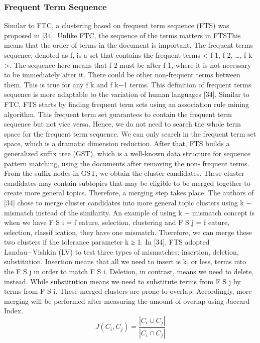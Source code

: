 \documentclass{VUMIFInfKursinis}
\begin{document}
		\subsubsection{Frequent Term Sequence}
			Similar to FTC, a clustering based on frequent term sequence (FTS) was proposed in [34]. Unlike FTC, the sequence of the terms matters in FTS\. This means that the order of terms in the document is important. The frequent terms sequence, denoted as f, is a set that contains the frequent terms < f 1, f 2, \ldots, f k >. The sequence here means that f 2 must be after f 1, where it is not necessary to be immediately after it. There could be other non-frequent terms between them. This is true for any f k and f k−1 terms. This definition of frequent terms sequence is more adaptable to the variation of human languages [34].
			Similar to FTC, FTS starts by finding frequent term sets using an association rule mining algorithm. This frequent term set guarantees to contain the frequent term sequence but not vice versa. Hence, we do not need to search the whole term space for the frequent term sequence. We can only search in the frequent term set space, which is a dramatic dimension reduction. After that, FTS builds a generalized suffix tree (GST), which is a well-known data structure for sequence pattern matching, using the documents after removing the non- frequent terms. From the suffix nodes in GST, we obtain the cluster candidates. These cluster candidates may contain subtopics that may be eligible to be merged together to create more general topics. Therefore, a merging step takes place.
			The authors of [34] chose to merge cluster candidates into more general topic clusters using k − mismatch instead of the similarity. An example of using k − mismatch concept is when we have F S i = {f eature, selection, clustering} and F S j = {f eature, selection, classif ication}, they have one mismatch. Therefore, we can merge these two clusters if the tolerance parameter k ≥ 1. In [34], FTS adopted Landau−Vishkin (LV) to test three types of mismatches: insertion, deletion, substitution. Insertion means that all we need to insert is k, or less, terms into the F S j in order to match F S i. Deletion, in contrast, means we need to delete, instead. While substitution means we need to substitute terms from F S j by terms from F S i.
			These merged clusters are prone to overlap. Accordingly, more merging will be performed after measuring the amount of overlap using Jaccard Index.
			\begin{equation}
				J(C_i,C_j) = \frac{|C_i \cup C_j|}{|C_i \cap C_j|}
			\end{equation}
\end{document}
